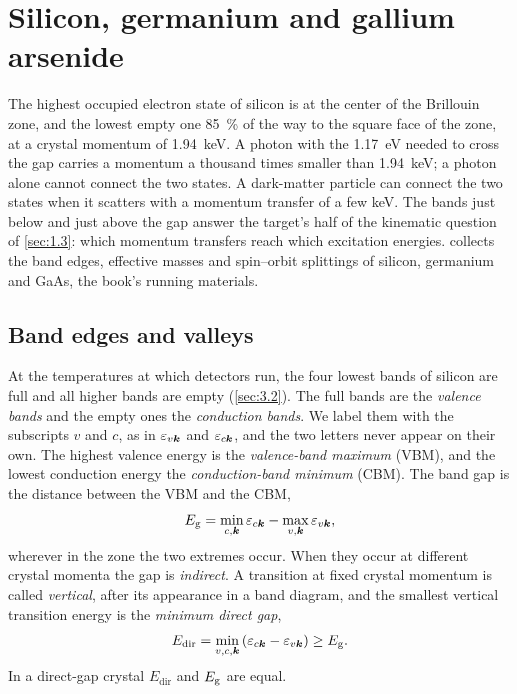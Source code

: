 \section{Silicon, germanium and gallium arsenide}\label{sec:3.3}

The highest occupied electron state of silicon is at the center of the Brillouin zone, and the lowest empty one \SI{85}{\percent} of the way to the square face of the zone, at a crystal momentum of \SI{1.94}{keV}. A photon with the \SI{1.17}{eV} needed to cross the gap carries a momentum a thousand times smaller than \SI{1.94}{keV}; a photon alone cannot connect the two states. A dark-matter particle can connect the two states when it scatters with a momentum transfer of a few keV. The bands just below and just above the gap answer the target's half of the kinematic question of \cref{sec:1.3}: which momentum transfers reach which excitation energies.  collects the band edges, effective masses and spin--orbit splittings of silicon, germanium and GaAs, the book's running materials.

\subsection{Band edges and valleys}

At the temperatures at which detectors run, the four lowest bands of silicon are full and all higher bands are empty (\cref{sec:3.2}). The full bands are the \emph{valence bands} and the empty ones the \emph{conduction bands}. We label them with the subscripts $v$ and $c$, as in $\varepsilon_{v\bm{k}}$ and $\varepsilon_{c\bm{k}}$, and the two letters never appear on their own. The highest valence energy is the \emph{valence-band maximum} (VBM), and the lowest conduction energy the \emph{conduction-band minimum} (CBM). The band gap is the distance between the VBM and the CBM,
\begin{equation}
  E_{\mathrm{g}} = \min_{c,\bm{k}}\varepsilon_{c\bm{k}} - \max_{v,\bm{k}}\varepsilon_{v\bm{k}} ,
  \label{eq:3.3-Eg}
\end{equation}
wherever in the zone the two extremes occur. When they occur at different crystal momenta the gap is \emph{indirect}. A transition at fixed crystal momentum is called \emph{vertical}, after its appearance in a band diagram, and the smallest vertical transition energy is the \emph{minimum direct gap},
\begin{equation}
  E_{\mathrm{dir}} = \min_{v,c,\bm{k}}\left(\varepsilon_{c\bm{k}} - \varepsilon_{v\bm{k}}\right) \ge E_{\mathrm{g}} .
  \label{eq:3.3-Edir}
\end{equation}
In a direct-gap crystal $E_{\mathrm{dir}}$ and $E_{\mathrm{g}}$ are equal.

